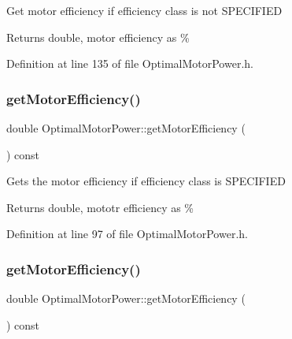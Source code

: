 Get motor efficiency if efficiency class is not S\+P\+E\+C\+I\+F\+I\+ED

\begin{DoxyReturn}{Returns}
double, motor efficiency as \% 
\end{DoxyReturn}


Definition at line 135 of file Optimal\+Motor\+Power.\+h.

\mbox{\label{class_optimal_motor_power_a10b3528bec621cab146608c6326526e3}} 
\subsubsection{\texorpdfstring{get\+Motor\+Efficiency()}{getMotorEfficiency()}\hspace{0.1cm}{\footnotesize\ttfamily [1/3]}}
{\footnotesize\ttfamily double Optimal\+Motor\+Power\+::get\+Motor\+Efficiency (\begin{DoxyParamCaption}{ }\end{DoxyParamCaption}) const\hspace{0.3cm}{\ttfamily [inline]}}

Gets the motor efficiency if efficiency class is S\+P\+E\+C\+I\+F\+I\+ED

\begin{DoxyReturn}{Returns}
double, mototr efficiency as \% 
\end{DoxyReturn}


Definition at line 97 of file Optimal\+Motor\+Power.\+h.

\mbox{\label{class_optimal_motor_power_a10b3528bec621cab146608c6326526e3}} 
\subsubsection{\texorpdfstring{get\+Motor\+Efficiency()}{getMotorEfficiency()}\hspace{0.1cm}{\footnotesize\ttfamily [2/3]}}
{\footnotesize\ttfamily double Optimal\+Motor\+Power\+::get\+Motor\+Efficiency (\begin{DoxyParamCaption}{ }\end{DoxyParamCaption}) const\hspace{0.3cm}{\ttfamily [inline]}}

